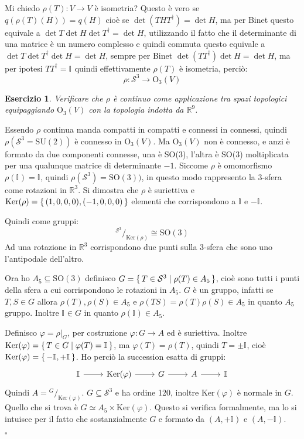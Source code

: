 \documentclass[10pt, twoside=false, x11names]{scrbook}
\newcounter{exercises}
\newtheorem{exercise}[exercises]{Esercizio}
\newenvironment{proof}{{\textbf{Dimostrazione}:}}{\hfill $\square$}
\renewcommand{\ker}[1]{\mathrm{Ker}( #1)}
\renewcommand{\phi}{\varphi}
\newcommand{\RN}[1][]{\mathbb{R}^#1}
\newcommand{\Id}[1][]{\mathbb{I}_#1}
\newcommand{\Sph}[1][]{\mathcal{S}^#1}
\newcommand*\quot[2]{{^{\textstyle #1}\big/_{\textstyle #2}}}
\begin{document}
\begin{proof}
  Mi chiedo $ \rho(T) \colon V \to V $ è isometria? Questo è vero se $ q(\rho(T)(H)) = q(H) $
  cioè se $ \det(THT^\dagger) = \det{H} $, ma per Binet questo equivale a
  $ \det{T}\det{H}\det{T^\dagger} = \det{H} $, utilizzando il fatto che il determinante
  di una matrice è un numero complesso e quindi commuta questo equivale a
  $ \det{T}\det{T^\dagger}\det{H} = \det{H} $, sempre per Binet  $ \det(TT^\dagger)\det{H} = \det{H} $,
  ma per ipotesi $ TT^\dagger = \Id{} $ quindi effettivamente $ \rho(T) $ è isometria, perciò:
  \[
    \rho \colon \Sph{3} \to \mathrm{O}_3(V)
  \]
  \begin{exercise}
    Verificare che $ \rho $ è continuo come applicazione tra spazi topologici
    equipaggiando $ \mathrm{O}_3(V) $ con la topologia indotta da $ \RN{9} $.
  \end{exercise}
  Essendo $ \rho $ continua manda compatti in compatti e connessi in connessi, quindi
  $ \rho(\Sph{3}= \mathrm{SU(2)}) $ è connesso in $ \mathrm{O}_3(V) $.
  Ma $ \mathrm{O}_3(V) $ non è connesso, e anzi è formato da due componenti connesse,
  una è SO(3), l'altra è SO(3) moltiplicata per una qualunque matrice di determinante
  $ - 1 $. Siccome $ \rho $ è omomorfismo $ \rho(\Id{}) = \Id{} $, quindi $ \rho(\Sph{3}) =  \mathrm{SO(3)}) $,
  in questo modo rappresento la $ 3 $-sfera come rotazioni in $ \RN{3} $.
  Si dimostra che $ \rho $ è suriettiva e $ \ker{\rho} = \set{(1,0,0,0), (-1,0,0,0)} $ elementi
  che corrispondono a $ \Id{} $ e $ -\Id{} $.

  Quindi come gruppi:
  \[
    \quot{\Sph{3}}{\ker{\rho}} \cong \mathrm{SO(3)}
  \]
  Ad una rotazione in $ \RN{3} $ corrispondono due punti sulla $ 3 $-sfera che sono
  uno l'antipodale dell'altro.

  Ora ho $ A_5 \subseteq \mathrm{SO(3)} $ definisco $ G = \set{ T \in \Sph{3} | \rho(T) \in A_5} $,
  cioè sono tutti i punti della sfera a cui corrispondono le rotazioni in $ A_5 $.
  $ G $ è un gruppo, infatti se $ T, S \in G $ allora $ \rho(T), \rho(S) \in A_5 $ e
  $ \rho(TS) = \rho(T)\rho(S) \in A_5 $ in quanto $ A_5 $ gruppo. Inoltre $ \Id{} \in G $ in quanto
  $ \rho(\Id{}) \in A_5 $.

  Definisco $ \phi = \rho \big \lvert_G $, per costruzione $ \phi \colon G \to A $ ed è suriettiva.
  Inoltre $ \ker{\phi} = \set{ T \in G | \phi(T) = \Id{}} $, ma $ \phi(T) = \rho(T) $, quindi
  $ T = \pm \Id{} $, cioè $ \ker{\phi} = \set{- \Id{}, + \Id{}} $. Ho perciò la succession
  esatta di gruppi:
  \[
    \begin{tikzcd}
      \Id{} \arrow{r}{} & \ker{\phi} \arrow{r}{} & G \arrow{r}{} & A \arrow{r}{} & \Id{}
    \end{tikzcd}
  \]
  Quindi $ A = \quot{G}{\ker{\phi}} $.
  $ G \subseteq \Sph{3} $ e ha ordine 120, inoltre $ \ker{\phi} $ è normale in $ G $.
  Quello che si trova è $ G \simeq A_5 \times \ker{\phi} $. Questo si verifica formalmente, ma lo si
  intuisce per il fatto che sostanzialmente $ G $ e formato da $ (A, + \Id{}) $ e  $ (A, - \Id{}) $.


\end{proof}
\end{document}
